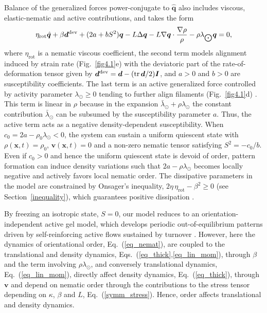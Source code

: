 Balance of the generalized forces power-conjugate to $\hat{\bm{q}}$ also includes viscous, elastic-nematic and active contributions, and takes the form  
\begin{equation} \label{eq_nemat}
	\eta_{\text{rot}} \hat{\bm{q}} + \beta \bm{d}^{\rm dev} + (2a + b S^2)  \bm{q} - L \Delta \bm{q} - L  \nabla\bm{q} \cdot \frac{\nabla \rho}{\rho} - \rho \lambda_{\bigodot} \bm{q} = 0,
\end{equation}
where $\eta_{\text{rot}}$ is a nematic viscous coefficient, the second term models alignment induced by strain rate (Fig.~\ref{fig4.1}e) with the deviatoric part of the rate-of-deformation tensor given by $\bm{d}^{\rm dev} = \bm{d} - ({\rm tr}\,\bm{d}/2) \bm{I}$, and $a>0$ and $b>0$ are susceptibility coefficients. The last term is an active generalized force controlled by activity parameter $\lambda_{\odot}\ge 0$  tending to further align filaments (Fig.~\ref{fig4.1}d) \cite{anne2016}. This term is linear in $\rho$ because in the expansion $\bar{\lambda}_{\odot} + \rho \lambda_{\odot}$ the constant contribution $\bar{\lambda}_{\odot}$ can be subsumed by the susceptibility parameter $a$. Thus, the active term acts as a negative density-dependent susceptibility. When $c_0 =2a - \rho_0 \lambda_{\odot}<0$, the system can sustain a uniform quiescent state with $\rho(\bm{x},t) = \rho_0$, $\bm{v}(\bm{x},t) = 0$ and a  non-zero nematic tensor satisfying $S^2 = -c_0/b$. Even if $c_0>0$ and hence the uniform quiescent state is devoid of order,  pattern formation can induce density variations such that $2a - \rho \lambda_{\odot}$ becomes locally negative and actively favors local nematic order. The dissipative parameters in the model are constrained by Onsager's inequality, $2\eta \, \eta_{\text{rot}} - \beta^2 \geq 0$ (see Section~\ref{inequality}), which guarantees positive dissipation \cite{Onsager1931}.

By freezing an isotropic state, $S=0$, our model reduces to an orientation-independent active gel model, which develops periodic out-of-equilibrium patterns driven by self-reinforcing active flows sustained by turnover \cite{hannezo2015}. However, here the dynamics of orientational order, Eq.~(\ref{eq_nemat}), are coupled to the translational and density dynamics, Eqs.~(\ref{eq_thick},\ref{eq_lin_mom}), through $\beta$ and the term involving $\rho \lambda_{\odot}$, and conversely translational  dynamics, Eq.~(\ref{eq_lin_mom}), directly affect density dynamics, Eq.~(\ref{eq_thick}),  through $\bm{v}$ and depend on nematic order through the contributions to the stress tensor depending on $\kappa$, $\beta$ and $L$, Eq.~(\ref{symm_stress}). Hence, order affects translational and density dynamics. 

